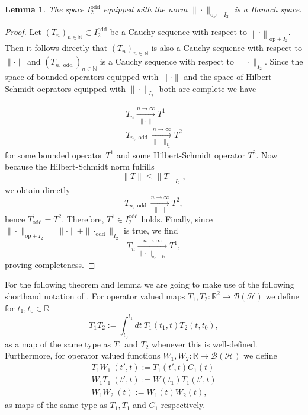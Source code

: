 \documentclass[b5paper,draft,openbib,12pt]{memoir}
\newtheorem{Lemma}[Def]{Lemma}
\DeclareMathOperator{\odd}{odd}
\begin{document}
\begin{Lemma}\label{completeness of I_2 odd}
The space \(I_2^{\odd}\)
equipped with the norm 
\(\|\cdot\|_{\mathrm{op}+I_2}\) is a 
Banach space.
\end{Lemma}
\begin{proof}
Let \((T_n)_{n\in\mathbb{N}}\subset I_2^{\odd}\)
be a Cauchy sequence with 
respect to \(\left\|\cdot\right\|_{\mathrm{op}+I_2}\). 
Then it follows directly that 
\((T_n)_{n\in\mathbb{N}}\)
is also a Cauchy sequence with 
respect to \(\|\cdot\|\) and
\((T_{n,\odd})_{n\in\mathbb{N}}\) is a Cauchy
sequence with respect to
\(\|\cdot\|_{I_2}\). Since 
the space of bounded operators equipped with
\(\|\cdot\|\) and
the space of Hilbert-Schmidt oeprators 
equipped with \(\|\cdot\|_{I_2}\) both are
complete we have

\begin{align}
T_n\xrightarrow[\|\cdot\|]{n\rightarrow \infty} T^1\\
T_{n,\odd}\xrightarrow[\|\cdot\|_{I_2}]{n\rightarrow \infty} T^2
\end{align}
for some bounded operator \(T^1\) and some 
Hilbert-Schmidt operator \(T^2\). Now because 
the Hilbert-Schmidt norm  fulfills
\begin{equation}
\|T\|\le \|T\|_{I_2},
\end{equation} 
we obtain directly
\begin{equation}
T_{n,\odd}\xrightarrow[\|\cdot\|]{n\rightarrow \infty} T^2,
\end{equation}
hence \(T^1_{\odd}=T^2\). 
Therefore, \(T^1\in I_2^{\odd}\) holds. 
Finally, since 
\(\|\cdot\|_{\mathrm{op}+I_2}
=\|\cdot\|+\|\cdot_{\odd}\|_{I_2}\) is true, 
we find 
\begin{equation}
T_n\xrightarrow[\|\cdot\|_{\mathrm{op}+I_2}]{n\rightarrow \infty} T^1,
\end{equation}
proving completeness.
\end{proof}


For the following theorem and lemma we are going to 
make use of the 
following shorthand notation of \cite{ivp0}. For operator valued maps 
\(T_1,T_2:\mathbb{R}^2\to \mathcal{B}(\mathcal{H}) \) we define 
for \(t_1,t_0\in\mathbb{R}\)
\begin{equation}
T_1T_2 := \int_{t_0}^{t_1}dt~ T_1(t_1,t)T_2(t,t_0),
\end{equation}
as a map of the same type as \(T_1\) and \(T_2\)
whenever this is well-defined. Furthermore, for operator valued functions
\(W_1,W_2:\mathbb{R}\to \mathcal{B}(\mathcal{H})\) we define
\begin{align}\label{ivp0 shortnotation 1}
T_1W_1~(t',t):=T_1(t',t)C_1(t)\\\label{ivp0 shortnotation 2}
W_1 T_1~(t',t):=W(t_1)T_1(t',t)\\
W_1W_2~(t):=W_1(t)W_2(t),
\end{align}
as maps of the same type as \(T_1, T_1\) and \(C_1\) 
respectively.
\end{document}
